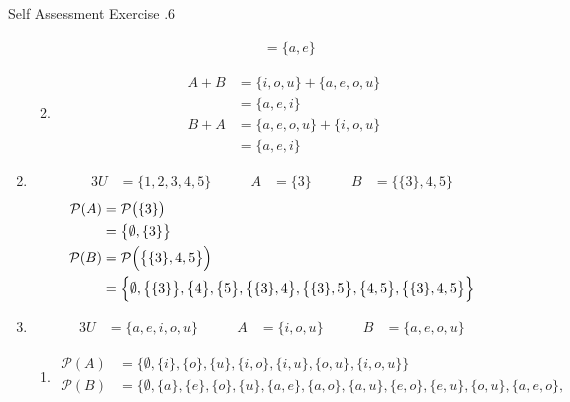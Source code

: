 \documentclass[../notes.tex]{subfiles}
\begin{document}
\begin{exercise}{Self Assessment Exercise \thechapter.6}
\begin{enumerate}
\begin{enumerate}[label=(\alph*)]
\begin{align*}
                  &= \{a, e\}
                \end{align*}
              \item \rule{0pt}{11pt} \vspace*{-25pt}
                \begin{align*}
                  A + B &= \{i, o, u\} + \{a, e, o, u\}\\
                  &= \{a, e, i\}\\
                  B + A &= \{a, e, o, u\} + \{i, o, u\}\\
                  &= \{a, e, i\}
                \end{align*}
            \end{enumerate}
          \item \rule{0pt}{11pt} \vspace*{-25pt}
            \begin{alignat*}{3}
              U &= \{1, 2, 3, 4, 5\} \qquad & A &= \{3\} \qquad & B &= \bigl\{\{3\}, 4, 5\bigr\}
            \end{alignat*}
            \begin{align*}
              \mathcal{P}(A) &= \mathcal{P}\bigl(\{3\}\bigr)\\
              &= \bigl\{\emptyset, \{3\}\bigr\}\\
              \mathcal{P}(B) &= \mathcal{P}\Bigl(\bigl\{\{3\}, 4, 5\bigr\}\Bigr)\\
              &= \Bigl\{\emptyset, \bigl\{\{3\}\bigr\}, \bigl\{4\bigr\}, \bigl\{5\bigr\}, \bigl\{\{3\}, 4\bigr\}, \bigl\{\{3\}, 5\bigr\}, \bigl\{4, 5\bigr\}, \bigl\{\{3\}, 4, 5\bigr\}\Bigr\}
            \end{align*}
          \item \rule{0pt}{11pt} \vspace*{-25pt}
            \begin{alignat*}{3}
              U &= \{a, e, i, o, u\} \qquad & A &= \{i, o, u\} \qquad & B &= \{a, e, o, u\}
            \end{alignat*}
            \begin{enumerate}[label=(\alph*)]
              \item \rule{0pt}{11pt} \vspace*{-25pt}
                \begin{align*}
                  \mathcal{P}(A) &= \bigl\{\emptyset, \{i\}, \{o\}, \{u\}, \{i, o\}, \{i, u\}, \{o, u\}, \{i, o, u\}\bigr\}\\
                  \mathcal{P}(B) &= \bigl\{\emptyset, \{a\}, \{e\}, \{o\}, \{u\}, \{a, e\}, \{a, o\}, \{a, u\}, \{e, o\}, \{e, u\}, \{o, u\}, \{a, e, o\},\\

\end{align*}
\end{enumerate}
\end{enumerate}
\end{exercise}
\end{document}
